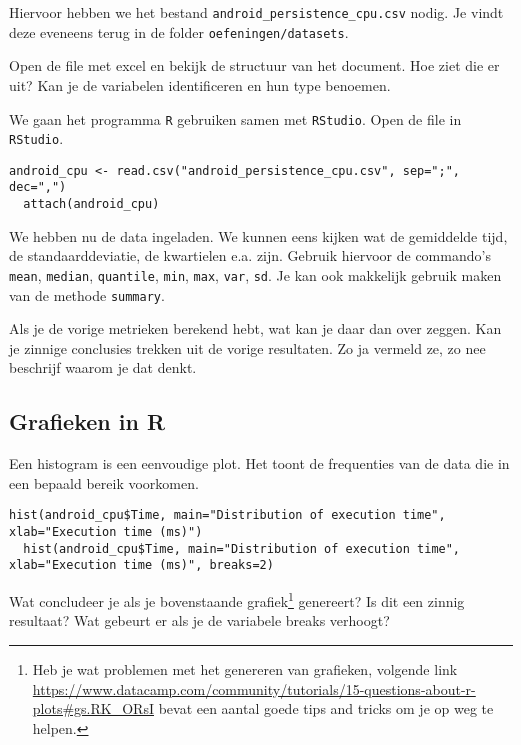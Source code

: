 Hiervoor hebben we het bestand \texttt{android\_persistence\_cpu.csv} nodig. Je vindt deze eveneens terug in de folder \texttt{oefeningen/datasets}.

\begin{exercise}
  \label{oef:casus-akin2016-1var}
	Open de file met excel en bekijk de structuur van het document. Hoe ziet die er uit? Kan je de variabelen identificeren en hun type benoemen. 
\end{exercise}

We gaan het programma \texttt{R} gebruiken samen met \texttt{RStudio}. Open de file in \texttt{RStudio}.

\begin{lstlisting}[breaklines=true]
  android_cpu <- read.csv("android_persistence_cpu.csv", sep=";", dec=",")
  attach(android_cpu)
\end{lstlisting}

We hebben nu de data ingeladen. We kunnen eens kijken wat de gemiddelde tijd, de standaarddeviatie, de kwartielen e.a. zijn. Gebruik hiervoor de commando's \texttt{mean}, \texttt{median}, \texttt{quantile}, \texttt{min}, \texttt{max}, \texttt{var}, \texttt{sd}. Je kan ook makkelijk gebruik maken van de methode \texttt{summary}.

\begin{exercise}
	Als je de vorige metrieken berekend hebt, wat kan je daar dan over zeggen. Kan je zinnige conclusies trekken uit de vorige resultaten. Zo ja vermeld ze, zo nee beschrijf waarom je dat denkt.
\end{exercise}


\subsection{Grafieken in R}


Een histogram is een eenvoudige plot. Het toont de frequenties van de data die in een bepaald bereik voorkomen. 

\begin{lstlisting}[breaklines=true]
  hist(android_cpu$Time, main="Distribution of execution time", xlab="Execution time (ms)")
  hist(android_cpu$Time, main="Distribution of execution time", xlab="Execution time (ms)", breaks=2)
\end{lstlisting}
\begin{exercise}
	Wat concludeer je als je bovenstaande grafiek\footnote{Heb je wat problemen met het genereren van grafieken, volgende link \url{https://www.datacamp.com/community/tutorials/15-questions-about-r-plots\#gs.RK_ORsI} bevat een aantal goede tips and tricks om je op weg te helpen.} genereert? Is dit een zinnig resultaat? Wat gebeurt er als je de variabele breaks verhoogt?
\end{exercise}

